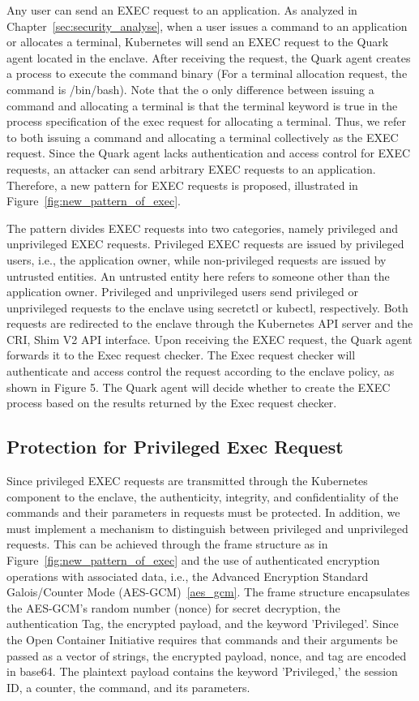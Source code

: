 Any user can send an EXEC request to an application. As analyzed in Chapter~\ref{sec:security_analyse}, when a user issues a command to an application or allocates a terminal, Kubernetes will send an EXEC request to the Quark agent located in the enclave. After receiving 
the request, the Quark agent creates a process to execute the command binary (For a terminal allocation request, the command is /bin/bash). Note that the o only difference between issuing a command and allocating a terminal is that the terminal 
keyword is true in the process specification of the exec request for allocating a terminal. Thus, we refer to both issuing a command and allocating a terminal collectively as the EXEC request. Since the Quark agent lacks authentication and access 
control for EXEC requests, an attacker can send arbitrary EXEC requests to an application. Therefore, a new pattern for EXEC requests is proposed, illustrated in Figure~\ref{fig:new_pattern_of_exec}.

The pattern divides EXEC requests into two categories, namely privileged and unprivileged EXEC requests. Privileged EXEC requests are issued by privileged users, i.e., the application owner, while non-privileged requests are issued by untrusted 
entities. An untrusted entity here refers to someone other than the application owner. Privileged and unprivileged users send privileged or unprivileged requests to the enclave using secretctl or kubectl, respectively. Both requests are redirected 
to the enclave through the Kubernetes  API server and the CRI, Shim V2 API interface. Upon receiving the EXEC request, the Quark agent forwards it to the Exec request checker. The Exec request checker will authenticate and access control the request 
according to the enclave policy, as shown in Figure 5. The Quark agent will decide whether to create the EXEC process based on the results returned by the Exec request checker.


\subsection{Protection for Privileged Exec Request}
Since privileged EXEC requests are transmitted through the Kubernetes  component to the enclave, the authenticity, integrity, and confidentiality of the commands and their parameters in requests must be protected. In addition, we must implement a mechanism 
to distinguish between privileged and unprivileged requests. This can be achieved through the frame structure as in Figure~\ref{fig:new_pattern_of_exec} and the use of authenticated encryption operations with associated data, i.e., the Advanced 
Encryption Standard Galois/Counter Mode (AES-GCM)~\ref{aes_gcm}. The frame structure encapsulates the AES-GCM's random number (nonce) for secret decryption, the authentication Tag, the encrypted payload, and the keyword 'Privileged'. Since the Open Container 
Initiative requires that commands and their arguments be passed as a vector of strings, the encrypted payload, nonce, and tag are encoded in base64. The plaintext payload contains the keyword 'Privileged,' the session ID, a counter, the command, 
and its parameters.

